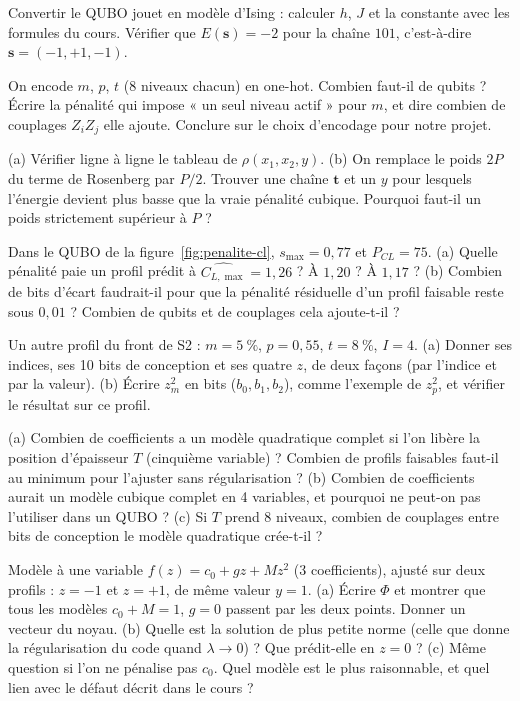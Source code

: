 \exercices
\begin{exercice}
Convertir le QUBO jouet en modèle d'Ising : calculer $h$, $J$ et la constante avec les formules du cours. Vérifier que $E(\mathbf s)=-2$ pour la chaîne $101$, c'est-à-dire $\mathbf s=(-1,+1,-1)$.
\end{exercice}
\begin{exercice}
On encode $m$, $p$, $t$ (8 niveaux chacun) en one-hot. Combien faut-il de qubits ? Écrire la pénalité qui impose « un seul niveau actif » pour $m$, et dire combien de couplages $Z_iZ_j$ elle ajoute. Conclure sur le choix d'encodage pour notre projet.
\end{exercice}
\begin{exercice}\label{ex:rosenberg}
(a) Vérifier ligne à ligne le tableau de $\rho(x_1,x_2,y)$. (b) On remplace le poids $2P$ du terme de Rosenberg par $P/2$. Trouver une chaîne $\mathbf t$ et un $y$ pour lesquels l'énergie devient plus basse que la vraie pénalité cubique. Pourquoi faut-il un poids strictement supérieur à $P$ ?
\end{exercice}
\begin{exercice}\label{ex:ecart}
Dans le QUBO de la figure~\ref{fig:penalite-cl}, $s_{\max}=0{,}77$ et $P_{CL}=75$. (a) Quelle pénalité paie un profil prédit à $\widehat{C_{L,\max}}=1{,}26$ ? À $1{,}20$ ? À $1{,}17$ ? (b) Combien de bits d'écart faudrait-il pour que la pénalité résiduelle d'un profil faisable reste sous $0{,}01$ ? Combien de qubits et de couplages cela ajoute-t-il ?
\end{exercice}
\begin{exercice}\label{ex:encodage}
Un autre profil du front de S2 : $m=5~\%$, $p=0{,}55$, $t=8~\%$, $I=4$. (a) Donner ses indices, ses 10 bits de conception et ses quatre $z$, de deux façons (par l'indice et par la valeur). (b) Écrire $z_m^2$ en bits ($b_0,b_1,b_2$), comme l'exemple de $z_p^2$, et vérifier le résultat sur ce profil.
\end{exercice}
\begin{exercice}\label{ex:coefficients}
(a) Combien de coefficients a un modèle quadratique complet si l'on libère la position d'épaisseur $T$ (cinquième variable) ? Combien de profils faisables faut-il au minimum pour l'ajuster sans régularisation ? (b) Combien de coefficients aurait un modèle cubique complet en 4 variables, et pourquoi ne peut-on pas l'utiliser dans un QUBO ? (c) Si $T$ prend 8 niveaux, combien de couplages entre bits de conception le modèle quadratique crée-t-il ?
\end{exercice}
\begin{exercice}\label{ex:ridge}
Modèle à une variable $f(z)=c_0+gz+Mz^2$ (3 coefficients), ajusté sur deux profils : $z=-1$ et $z=+1$, de même valeur $y=1$. (a) Écrire $\Phi$ et montrer que tous les modèles $c_0+M=1$, $g=0$ passent par les deux points. Donner un vecteur du noyau. (b) Quelle est la solution de plus petite norme (celle que donne la régularisation du code quand $\lambda\to0$) ? Que prédit-elle en $z=0$ ? (c) Même question si l'on ne pénalise pas $c_0$. Quel modèle est le plus raisonnable, et quel lien avec le défaut décrit dans le cours ?
\end{exercice}

